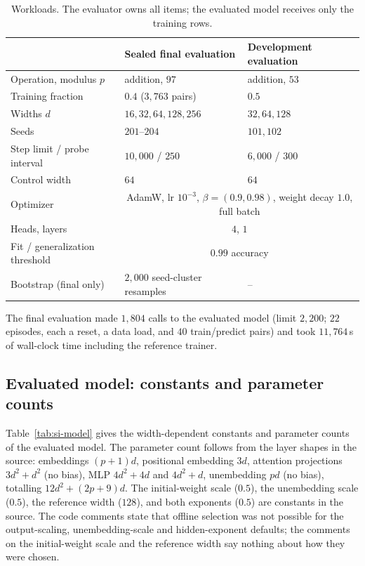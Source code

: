 \documentclass{article}
\begin{document}
\begin{table}[h]
\centering
\caption{Workloads. The evaluator owns all items; the evaluated model receives only the training rows.}
\label{tab:si-protocol}
\small
\begin{tabular}{lll}
\toprule
 & Sealed final evaluation & Development evaluation \\
\midrule
Operation, modulus $p$ & addition, $97$ & addition, $53$ \\
Training fraction & $0.4$ ($3{,}763$ pairs) & $0.5$ \\
Widths $d$ & $16,32,64,128,256$ & $32,64,128$ \\
Seeds & $201$--$204$ & $101,102$ \\
Step limit / probe interval & $10{,}000$ / $250$ & $6{,}000$ / $300$ \\
Control width & $64$ & $64$ \\
Optimizer & \multicolumn{2}{c}{AdamW, lr $10^{-3}$, $\beta=(0.9,0.98)$, weight decay $1.0$, full batch} \\
Heads, layers & \multicolumn{2}{c}{$4$, $1$} \\
Fit / generalization threshold & \multicolumn{2}{c}{$0.99$ accuracy} \\
Bootstrap (final only) & $2{,}000$ seed-cluster resamples & -- \\
\bottomrule
\end{tabular}
\end{table}

The final evaluation made $1{,}804$ calls to the evaluated model (limit $2{,}200$; $22$ episodes, each a reset, a data load, and $40$ train/predict pairs) and took $11{,}764$\,s of wall-clock time including the reference trainer.

\subsection{Evaluated model: constants and parameter counts}
\label{sec:si-model}
Table~\ref{tab:si-model} gives the width-dependent constants and parameter counts of the evaluated model. The parameter count follows from the layer shapes in the source: embeddings $(p+1)d$, positional embedding $3d$, attention projections $3d^2+d^2$ (no bias), MLP $4d^2+4d$ and $4d^2+d$, unembedding $pd$ (no bias), totalling $12d^2+(2p+9)d$. The initial-weight scale ($0.5$), the unembedding scale ($0.5$), the reference width ($128$), and both exponents ($0.5$) are constants in the source. The code comments state that offline selection was not possible for the output-scaling, unembedding-scale and hidden-exponent defaults; the comments on the initial-weight scale and the reference width say nothing about how they were chosen.
\end{document}
